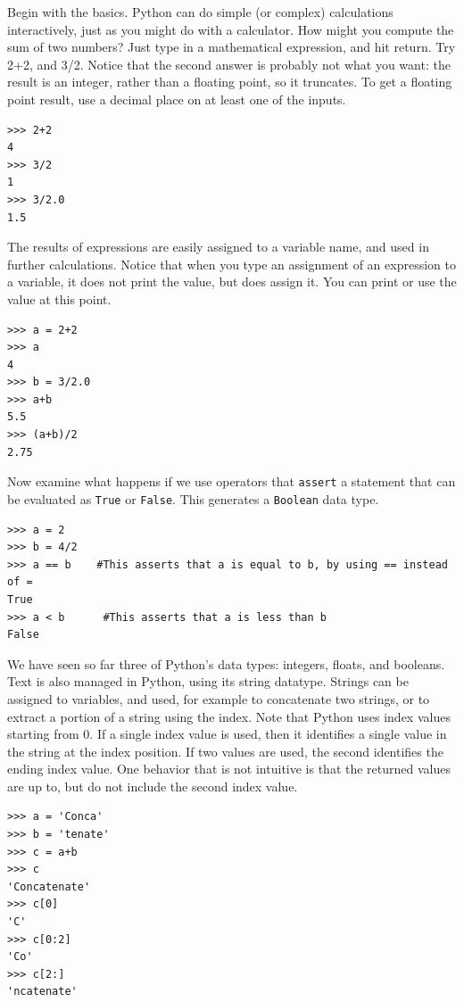 Begin with the basics.  Python can do simple (or complex) calculations interactively, just as you might do with a calculator.  How might you compute the sum of two numbers?  Just type in a mathematical expression, and hit return.  Try 2+2, and 3/2.  Notice that the second answer is probably not what you want: the result is an integer, rather than a floating point, so it truncates.  To get a floating point result, use a decimal place on at least one of the inputs.\\

\begin{lstlisting}
>>> 2+2
4
>>> 3/2
1
>>> 3/2.0
1.5
\end{lstlisting}

The results of expressions are easily assigned to a variable name, and used in further calculations.  Notice that when you type an assignment of an expression to a variable, it does not print the value, but does assign it.  You can print or use the value at this point.  \\

\begin{lstlisting}
>>> a = 2+2
>>> a
4
>>> b = 3/2.0
>>> a+b
5.5
>>> (a+b)/2
2.75
\end{lstlisting}

Now examine what happens if we use operators that \verb#assert# a statement that can be evaluated as \verb#True# or \verb#False#.  This generates a \verb#Boolean# data type.

\begin{lstlisting}
>>> a = 2
>>> b = 4/2
>>> a == b    #This asserts that a is equal to b, by using == instead of =
True
>>> a < b      #This asserts that a is less than b
False
\end{lstlisting}

We have seen so far three of Python's data types: integers, floats, and booleans.  Text is also managed in Python, using its string datatype.  Strings can be assigned to variables, and used, for example to concatenate two strings, or to extract a portion of a string using the index.  Note that Python uses index values starting from 0.  If a single index value is used, then it identifies a single value in the string at the index position.  If two values are used, the second identifies the ending index value.  One behavior that is not intuitive is that the returned values are up to, but do not include the second index value.\\

\begin{lstlisting}
>>> a = 'Conca'
>>> b = 'tenate'
>>> c = a+b
>>> c
'Concatenate'
>>> c[0]
'C'
>>> c[0:2]
'Co'
>>> c[2:]
'ncatenate'
\end{lstlisting}

